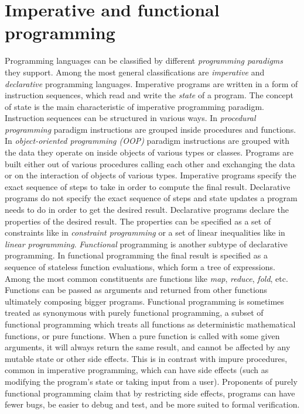 \section{Imperative and functional programming}
\label{backgrnd_programming_paradigms}
\quad Programming languages can be classified by different \textit{programming paradigms} they support. Among the most general classifications are \textit{imperative} and \textit{declarative} programming languages.\newline\null
\quad Imperative programs are written in a form of instruction sequences, which read and write the \textit{state} of a program. The concept of state is the main characteristic of imperative programming paradigm. Instruction sequences can be structured in various ways. In \textit{procedural programming} paradigm instructions are grouped inside procedures and functions. In \textit{object-oriented programming (OOP)} paradigm instructions are grouped with the data they operate on inside objects of various types or classes. Programs are built either out of various procedures calling each other and exchanging the data or on the interaction of objects of various types. Imperative programs specify the exact sequence of steps to take in order to compute the final result.\newline\null
\quad Declarative programs do not specify the exact sequence of steps and state updates a program needs to do in order to get the desired result. Declarative programs declare the properties of the desired result. The properties can be specified as a set of constraints like in \textit{constraint programming} or a set of linear inequalities like in \textit{linear programming}. \textit{Functional} programming is another subtype of declarative programming. In functional programming the final result is specified as a sequence of stateless function evaluations, which form a tree of expressions. Among the most common constituents are functions like \textit{map}, \textit{reduce}, \textit{fold}, etc. Functions can be passed as arguments and returned from other functions ultimately composing bigger programs.\newline\null
\quad Functional programming is sometimes treated as synonymous with purely functional programming, a subset of functional programming which treats all functions as deterministic mathematical functions, or pure functions. When a pure function is called with some given arguments, it will always return the same result, and cannot be affected by any mutable state or other side effects. This is in contrast with impure procedures, common in imperative programming, which can have side effects (such as modifying the program's state or taking input from a user). Proponents of purely functional programming claim that by restricting side effects, programs can have fewer bugs, be easier to debug and test, and be more suited to formal verification.\newline\null
